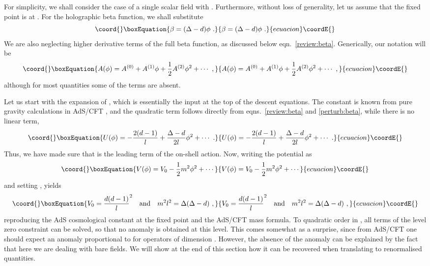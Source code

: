 \documentclass[a4paper,12pt]{article}
\begin{document}
For simplicity, we shall consider the case of a single scalar field
with \coordHE{}. Furthermore, without loss of generality, let us
assume that the fixed point is at 
\coordHE{}. For the holographic beta function, we shall substitute 
\begin{equation}\coord{}\boxEquation{
\label{perturb:beta}
  \beta = (\Delta-d) \phi~.
}{
\beta = (\Delta-d) \phi~.
}{ecuacion}\coordE{}\end{equation}
We are also neglecting higher derivative terms of the full beta function, 
as discussed below eqn.\ \eqref{review:beta}.  
Generically, our notation will be 
\begin{equation}\coord{}\boxEquation{
\label{perturb:form}
  A(\phi) = A^{(0)} + A^{(1)} \phi +\frac12 A^{(2)} \phi^2 +\cdots~, 
}{
A(\phi) = A^{(0)} + A^{(1)} \phi +\frac12 A^{(2)} \phi^2 +\cdots~, 
}{ecuacion}\coordE{}\end{equation}
although for most quantities some of the terms are absent.

Let us start with the expansion of \coordHE{}, which is essentially the input
at the top of the descent equations. The constant \coordHE{} is known
from pure gravity calculations in AdS/CFT
\cite{Liu98-1,Arutyunov98-1}, and the quadratic term follows directly
from eqns.\ \eqref{review:beta} and \eqref{perturb:beta}, while there
is no linear term, 
\begin{equation}\coord{}\boxEquation{
\label{perturb:U}
  U(\phi) = -\frac{2(d-1)}l + \frac{\Delta-d}{2l} \phi^2 +\cdots~.
}{
U(\phi) = -\frac{2(d-1)}l + \frac{\Delta-d}{2l} \phi^2 +\cdots~.
}{ecuacion}\coordE{}\end{equation}
Thus, we have made sure that \coordHE{} is the leading term of the on-shell
action. Now, writing the potential \coordHE{} as 
\begin{equation}\coord{}\boxEquation{
  V(\phi) = V_0 - \frac12 m^2 \phi^2 +\cdots
}{
  V(\phi) = V_0 - \frac12 m^2 \phi^2 +\cdots
}{ecuacion}\coordE{}\end{equation}
and setting \coordHE{}, yields 
\begin{equation}\coord{}\boxEquation{
  V_0 = \frac{d(d-1)}l^2 \quad \text{and} \quad
  m^2 l^2 = \Delta(\Delta-d)~,\label{formula34}
}{
  V_0 = \frac{d(d-1)}l^2 \quad \text{and} \quad
  m^2 l^2 = \Delta(\Delta-d)~,}{ecuacion}\coordE{}\end{equation}
reproducing the AdS cosmological constant at the fixed
point and the AdS/CFT mass formula. To quadratic order in \myHighlight{$\phi$}\coordHE{}, all
terms of the level zero constraint can be solved, so that no anomaly
is obtained at this level. This comes somewhat as a surprise, since
from AdS/CFT one should expect an anomaly proportional to \coordHE{}
for operators of dimension \coordHE{} \cite{deHaro00a}. 
However, the absence of the anomaly can be explained by the fact that
here we are dealing with bare fields.  We will show at the end of this
section how it can be recovered when translating to renormalised
quantities.
\end{document}
